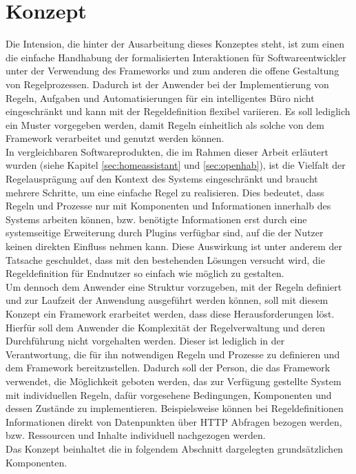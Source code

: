 \section{Konzept}
\label{sec:concept}
    Die Intension, die hinter der Ausarbeitung dieses Konzeptes steht, ist zum einen die einfache Handhabung der 
    formalisierten Interaktionen für Softwareentwickler %
    unter der Verwendung des Frameworks und zum anderen die 
    offene Gestaltung von Regelprozessen. Dadurch ist der Anwender bei der Implementierung von Regeln, Aufgaben und Automatisierungen 
    für ein intelligentes Büro nicht eingeschränkt und kann mit der Regeldefinition flexibel variieren.
    Es soll lediglich ein Muster vorgegeben werden, damit Regeln einheitlich als solche von dem Framework 
    verarbeitet und genutzt werden können. 
    \\ 
    \linebreak
    In vergleichbaren Softwareprodukten, die im Rahmen dieser Arbeit erläutert 
    wurden (siehe Kapitel \ref{sec:homeassistant} und \ref{sec:openhab}), ist die Vielfalt der Regelausprägung auf 
    den Kontext des Systems eingeschränkt und braucht mehrere Schritte, um eine einfache Regel zu realisieren. Dies bedeutet, dass 
    Regeln und Prozesse nur mit Komponenten und Informationen innerhalb des Systems arbeiten können, bzw. benötigte 
    Informationen erst durch eine systemseitige Erweiterung durch Plugins verfügbar sind, auf die der Nutzer keinen direkten 
    Einfluss nehmen kann. Diese Auswirkung ist unter anderem der 
    Tatsache geschuldet, dass mit den bestehenden Lösungen versucht wird, die Regeldefinition für Endnutzer so 
    einfach wie möglich zu gestalten. 
    \\
    \linebreak
    Um dennoch dem Anwender eine Struktur vorzugeben, mit der Regeln definiert und zur Laufzeit der Anwendung ausgeführt 
    werden können, soll mit diesem Konzept ein Framework erarbeitet werden, dass diese Herausforderungen löst. Hierfür soll 
    dem Anwender die Komplexität der Regelverwaltung und deren Durchführung nicht vorgehalten werden. Dieser ist lediglich 
    in der Verantwortung, die für ihn notwendigen Regeln und Prozesse zu definieren und dem Framework bereitzustellen. 
    Dadurch soll der Person, die das Framework verwendet, die Möglichkeit geboten werden, das zur Verfügung gestellte System 
    mit individuellen Regeln, dafür vorgesehene Bedingungen, Komponenten und dessen Zustände zu implementieren. Beispielsweise 
    können bei Regeldefinitionen Informationen direkt von Datenpunkten über \acs{HTTP} Abfragen bezogen werden, bzw. Ressourcen 
    und Inhalte individuell nachgezogen werden.
    \\ 
    Das Konzept beinhaltet die in folgendem Abschnitt dargelegten grundsätzlichen Komponenten. %

